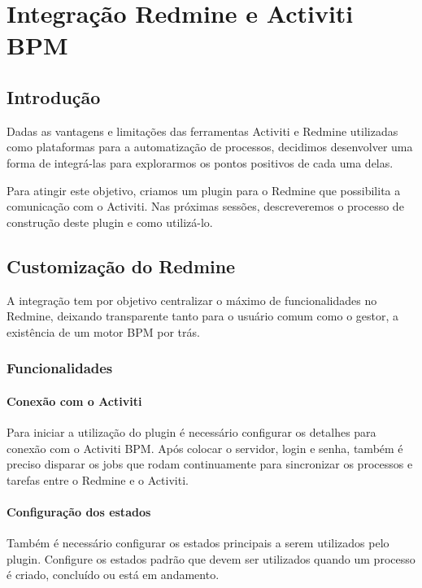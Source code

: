 \chapter{Integração Redmine e Activiti BPM}\label{chp:integracao_redmine_activiti}

\section{Introdução}\label{sec:integracao_redmine_activiti-introducao}
Dadas as vantagens e limitações das ferramentas Activiti e Redmine utilizadas como plataformas para a automatização de processos, decidimos desenvolver uma forma de integrá-las para explorarmos os pontos positivos de cada uma delas.

Para atingir este objetivo, criamos um plugin para o Redmine que possibilita a comunicação com o Activiti. Nas próximas sessões, descreveremos o processo de construção deste plugin e como utilizá-lo.


\section{Customização do Redmine}\label{sec:integracao_redmine_activiti-implementacao}

A integração tem por objetivo centralizar o máximo de funcionalidades no Redmine, deixando transparente tanto para o usuário comum como o gestor, a existência de um motor BPM por trás.

\subsection{Funcionalidades}\label{sec:integracao_redmine_activiti_implementacao_funcionalidades}
\subsubsection{Conexão com o Activiti }\label{sec:integracao_redmine_activiti_inplementacao_funcionalidades_conexão}
Para iniciar a utilização do plugin é necessário configurar os detalhes para conexão com o Activiti BPM.
Após colocar o servidor, login e senha, também é preciso disparar os jobs que rodam continuamente para sincronizar os processos e tarefas entre o Redmine e o Activiti.

\subsubsection{Configuração dos estados}\label{sec:integracao_redmine_activiti_inplementacao_funcionalidades_conexão}
Também é necessário configurar os estados principais a serem utilizados pelo plugin.
Configure os estados padrão que devem ser utilizados quando um processo é criado, concluído ou está em andamento.

